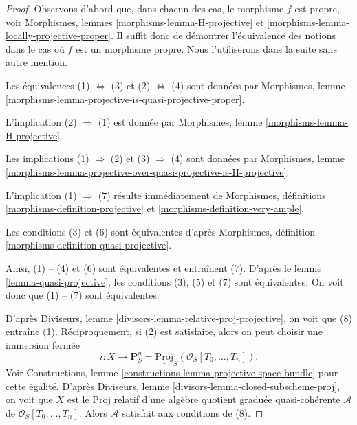 \begin{proof}
Observons d'abord que, dans chacun des cas, le morphisme $f$ est propre, voir
Morphismes, lemmes \ref{morphisms-lemma-H-projective} et
\ref{morphisms-lemma-locally-projective-proper}.
Il suffit donc de démontrer l'équivalence des notions dans le
cas où $f$ est un morphisme propre. Nous l'utiliserons dans la suite sans
autre mention.

\medskip\noindent
Les équivalences (1) $\Leftrightarrow$ (3) et
(2) $\Leftrightarrow$ (4) sont données par
Morphismes, lemme \ref{morphisms-lemma-projective-is-quasi-projective-proper}.

\medskip\noindent
L'implication (2) $\Rightarrow$ (1) est donnée par
Morphismes, lemme \ref{morphisms-lemma-H-projective}.

\medskip\noindent
Les implications (1) $\Rightarrow$ (2) et (3) $\Rightarrow$ (4) sont données par
Morphismes, lemme
\ref{morphisms-lemma-projective-over-quasi-projective-is-H-projective}.

\medskip\noindent
L'implication (1) $\Rightarrow$ (7) résulte immédiatement de
Morphismes, définitions \ref{morphisms-definition-projective} et
\ref{morphisms-definition-very-ample}.

\medskip\noindent
Les conditions (3) et (6) sont équivalentes d'après
Morphismes, définition \ref{morphisms-definition-quasi-projective}.

\medskip\noindent
Ainsi, (1) -- (4) et (6) sont équivalentes et entraînent (7). D'après le
lemme \ref{lemma-quasi-projective},
les conditions (3), (5) et (7) sont équivalentes.
On voit donc que (1) -- (7) sont équivalentes.

\medskip\noindent
D'après Diviseurs, lemme \ref{divisors-lemma-relative-proj-projective},
on voit que (8) entraîne (1). Réciproquement, si (2) est satisfaite, alors
on peut choisir une immersion fermée
$$
i :
X
\longrightarrow
\mathbf{P}^n_S = \underline{\text{Proj}}_S(\mathcal{O}_S[T_0, \ldots, T_n]).
$$
Voir Constructions, lemme \ref{constructions-lemma-projective-space-bundle}
pour cette égalité. D'après
Diviseurs, lemme \ref{divisors-lemma-closed-subscheme-proj},
on voit que $X$ est le Proj relatif d'une algèbre quotient graduée
quasi-cohérente $\mathcal{A}$ de $\mathcal{O}_S[T_0, \ldots, T_n]$.
Alors $\mathcal{A}$ satisfait aux conditions de (8).
\end{proof}

